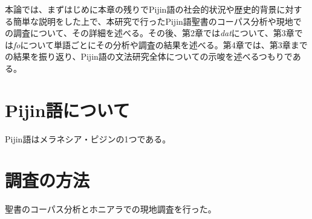 本論では、まずはじめに本章の残りでPijin語の社会的状況や歴史的背景に対する簡単な説明をした上で、本研究で行ったPijin語聖書のコーパス分析や現地での調査について、その詳細を述べる。その後、第2章では\textit{dat}について、第3章では\textit{fo}について単語ごとにその分析や調査の結果を述べる。第4章では、第3章までの結果を振り返り、Pijin語の文法研究全体についての示唆を述べるつもりである。

\section{Pijin語について}

Pijin語はメラネシア・ピジンの1つである。

\section{調査の方法}

聖書のコーパス分析とホニアラでの現地調査を行った。
